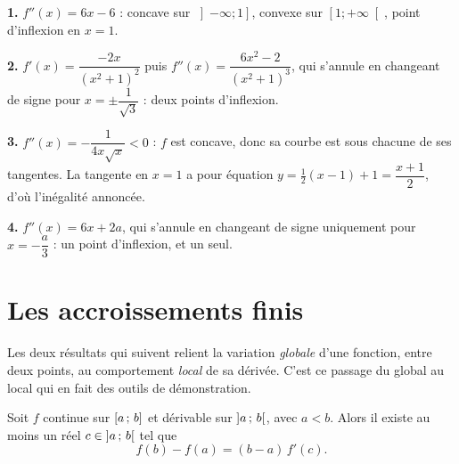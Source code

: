 \begin{corrige}
\textbf{1.} $f''(x) = 6x-6$ : concave sur $\left]-\infty ; 1\right]$, convexe
sur $\left[1 ; +\infty\right[$, point d'inflexion en $x=1$.

\textbf{2.} $f'(x) = \dfrac{-2x}{(x^{2}+1)^{2}}$ puis
$f''(x) = \dfrac{6x^{2}-2}{(x^{2}+1)^{3}}$, qui s'annule en changeant de signe
pour $x = \pm\dfrac{1}{\sqrt{3}}$ : deux points d'inflexion.

\textbf{3.} $f''(x) = -\dfrac{1}{4x\sqrt{x}} < 0$ : $f$ est concave, donc sa
courbe est sous chacune de ses tangentes. La tangente en $x=1$ a pour équation
$y = \tfrac{1}{2}(x-1)+1 = \dfrac{x+1}{2}$, d'où l'inégalité annoncée.

\textbf{4.} $f''(x) = 6x+2a$, qui s'annule en changeant de signe uniquement
pour $x = -\dfrac{a}{3}$ : un point d'inflexion, et un seul.
\end{corrige}

\section{Les accroissements finis}

Les deux résultats qui suivent relient la variation \emph{globale} d'une
fonction, entre deux points, au comportement \emph{local} de sa dérivée. C'est
ce passage du global au local qui en fait des outils de démonstration.

\begin{theoreme}
Soit $f$ continue sur $\left[a\,;\,b\right]$ et dérivable sur
$\left]a\,;\,b\right[$, avec $a < b$. Alors il existe au moins un réel
$c \in \left]a\,;\,b\right[$ tel que
\[
  f(b) - f(a) = (b-a)\, f'(c) .
\]
\end{theoreme}

